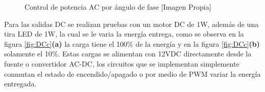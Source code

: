 \begin{figure}[H]
	\centering
	\caption{Control de potencia AC por ángulo de fase [Imagen Propia]}
	\label{fig:ACc}
\end{figure}

Para las salidas DC se realizan pruebas con un motor DC de 1W, además de una tira LED de 1W, la cual se le varia la energía entrega, como se observa en la figura \ref{fig:DCc}\textbf{(a)} la carga tiene el 100\% de la energía y en la figura \ref{fig:DCc}\textbf{(b)} solamente el 10\%. Estas cargas se alimentan con 12VDC directamente desde la fuente o convertidor AC-DC, los circuitos que se implementan simplemente conmutan el estado de encendido/apagado o por medio de PWM variar la energía entregada.

